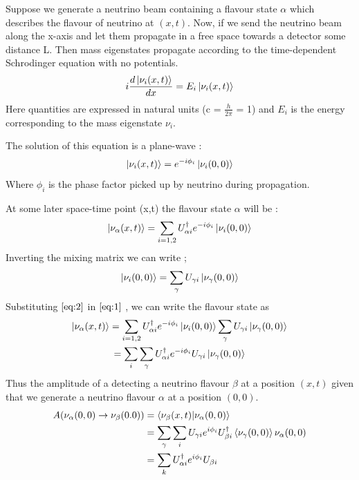 \documentclass[12pt,a4paper]{report}
\begin{document}
Suppose we generate a neutrino beam containing a flavour state $\alpha$ which describes the flavour of neutrino at $(x,t)$. Now, if we send the neutrino beam along the x-axis and let them propagate in a free space towards a detector some distance L. Then mass eigenstates propagate according to the time-dependent Schrodinger equation with no potentials.
\begin{equation}
i\frac{d\ket{\nu_{i}(x,t)}}{dx}=E_{i}\ket{\nu_{i}(x,t)}
\end{equation}
Here quantities are expressed in natural units (c = $\frac{h}{2\pi}$ = 1) and $E_{i}$ is the energy corresponding to the mass eigenstate $\nu_{i}$.\par
The solution of this equation is a plane-wave : 
\begin{equation}
\label{eq:0}
\ket{\nu_{i} (x,t)} = e^{-i\phi_{i}}\ket{\nu_{i} (0,0)}
\end{equation}
Where $\phi_{i}$ is the phase factor picked up by neutrino during propagation.\par
At some later space-time point (x,t) the flavour state $\alpha$ will be : 
\begin{equation}
\label{eq:1}
\ket{\nu_{\alpha}(x,t)} = \sum_{i=1,2} U_{\alpha i}^{\dagger} e^{-i\phi_{i}}\ket{\nu_{i}(0,0)}
\end{equation}
Inverting the mixing matrix we can write ;
\begin{equation}
\label{eq:2}
\ket{\nu_{i}(0,0)} = \sum_{\gamma} U_{\gamma i} \ket{\nu_{\gamma}(0,0)}
\end{equation}
Substituting $\ref{eq:2}$ in $\ref{eq:1}$ , we can write the flavour state as 
\begin{gather*}
\ket{\nu_{\alpha} (x,t)} =  \sum_{i=1,2} U_{\alpha i}^{\dagger}e^{-i\phi_{i}}\ket{\nu_{i}(0,0)}
\sum_{\gamma} U_{\gamma i} \ket{\nu_{\gamma}(0,0)}\\
 = \sum_{i}\sum_{\gamma} U_{\alpha i}^{\dagger} e^{-i\phi_{i}} U_{\gamma i} \ket{\nu_{\gamma}(0,0)}
\end{gather*}
Thus the amplitude of a detecting a neutrino flavour $\beta$ at a position $(x,t)$ given that we generate a neutrino flavour $\alpha$ at a position $(0,0)$.
\begin{equation}
\begin{split}
A(\nu_{\alpha} (0,0)\rightarrow\nu_{\beta}(0.0))& = \braket{\nu_{\beta}(x,t)|\nu_{\alpha}(0,0)}\\
& =\sum_{\gamma}\sum_{i} U_{\gamma i}e^{i\phi_{i}}U_{\beta i}^{\dagger}\braket{\nu_{\gamma}(0,0)}{\nu_{\alpha}(0,0)}\\
& =\sum_{k}U_{\alpha i}^{\dagger}e^{i\phi_{i}}U_{\beta i}
\end{split}
\end{equation}
\end{document}
